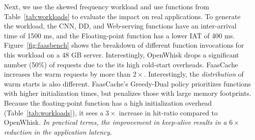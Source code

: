 Next, we use the skewed frequency workload and use functions from Table~\ref{tab:workloads} to evaluate the impact on real applications. 
To generate the workload, the CNN, DD, and Web-serving functions have an inter-arrival time of 1500 ms, and the Floating-point function has a lower IAT of 400 ms. 
%
Figure~\ref{fig:faasbench} shows the breakdown of different function invocations for this workload on a 48 GB server.
Interestingly, OpenWhisk drops a significant number (50\%) of requests due to the its high cold-start overheads.
FaasCache increases the warm requests by more than $2\times$. 
Interestingly, the \emph{distribution} of warm starts is also different. 
FaasCache's Greedy-Dual policy prioritizes functions with higher initialization times, but penalizes those with large memory footprints. 
Because the floating-point function has a high initialization overhead (Table~\ref{tab:workloads}), it sees a $3\times$ increase in hit-ratio compared to OpenWhisk.
\emph{In practical terms, the improvement in keep-alive results in a $6\times$ reduction in the application latency.
}

